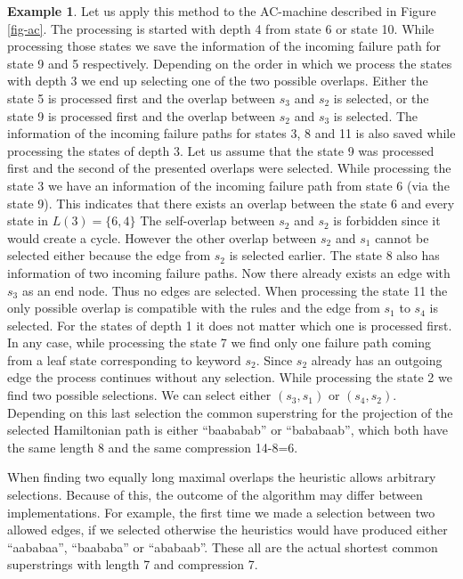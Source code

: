 \documentclass[english,twoside,censored,csm,algorithms-track-2020]{HYthesisML}
\theoremstyle{plain}
\theoremstyle{definition}
\newtheorem{example}[theorem]{Example}
\begin{document}
\begin{example}
Let us apply this method to the AC-machine described in Figure \ref{fig-ac}. The processing is started
with depth 4 from state 6 or state 10. While processing those states we save the information of
the incoming failure path for state 9 and 5 respectively. Depending on the order in which we process
the states with depth 3 we end up selecting one of the two possible overlaps. Either the state 5
is processed first and the overlap between $s_3$ and $s_2$ is selected, or the state 9 is processed
first and the overlap between $s_2$ and $s_3$ is selected. The information of the incoming failure
paths for states 3, 8 and 11 is also saved while processing the states of depth 3. Let us assume
that the state 9 was processed first and the second of the presented overlaps were selected.
While processing the state 3 we have an information of the incoming failure path from state 6 (via the
state 9). This indicates that there exists an overlap between the state 6 and every state
in $L(3)=\{6,4\}$ The self-overlap between $s_2$ and $s_2$ is forbidden since it would
create a cycle. However the other overlap between $s_2$ and $s_1$ cannot be selected either because
the edge from $s_2$ is selected earlier. The state 8 also has information of two incoming failure
paths. Now there already exists an edge with $s_3$ as an end node. Thus no edges are selected.
When processing the state 11 the only possible overlap is compatible with the rules and the edge
from $s_1$ to $s_4$ is selected. For the states of depth 1 it does not matter which one is processed
first. In any case, while processing the state 7 we find only one failure path coming from a leaf state
corresponding to keyword $s_2$. Since $s_2$ already has an outgoing edge the process continues
without any selection. While processing the state 2 we find two possible selections. We can select
either $(s_3,s_1)$ or $(s_4,s_2)$. Depending on this last selection the common superstring for
the projection of the selected Hamiltonian path is either ``baababab'' or ``bababaab'', which
both have the same length 8 and the same compression 14-8=6.

When finding two equally long maximal overlaps the heuristic allows arbitrary selections.
Because of this, the outcome of the algorithm may differ between implementations. For example,
the first time
we made a selection between two allowed edges, if we selected otherwise the heuristics would
have produced either ``aababaa'', ``baababa'' or ``ababaab''. These all are the actual shortest common
superstrings with length 7 and compression 7.
\end{example}
\end{document}
